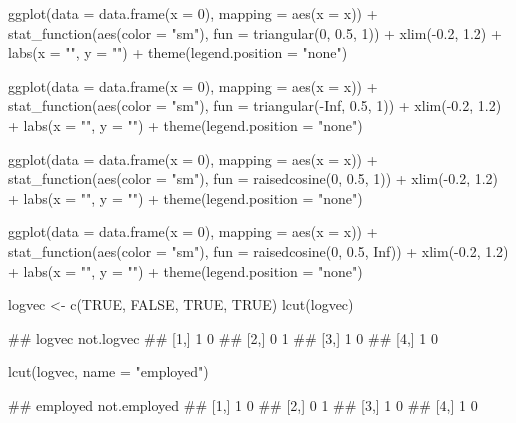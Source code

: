 \documentclass{article}\usepackage[]{graphicx}\usepackage[]{color}
\begin{document}
\begin{Schunk}
\begin{Sinput}
ggplot(data = data.frame(x = 0), mapping = aes(x = x)) + stat_function(aes(color = "sm"), 
    fun = triangular(0, 0.5, 1)) + xlim(-0.2, 1.2) + labs(x = "", y = "") + 
    theme(legend.position = "none")
\end{Sinput}
\end{Schunk}

\begin{Schunk}
\begin{Sinput}
ggplot(data = data.frame(x = 0), mapping = aes(x = x)) + stat_function(aes(color = "sm"), 
    fun = triangular(-Inf, 0.5, 1)) + xlim(-0.2, 1.2) + labs(x = "", y = "") + 
    theme(legend.position = "none")
\end{Sinput}
\end{Schunk}

\begin{Schunk}
\begin{Sinput}
ggplot(data = data.frame(x = 0), mapping = aes(x = x)) + stat_function(aes(color = "sm"), 
    fun = raisedcosine(0, 0.5, 1)) + xlim(-0.2, 1.2) + labs(x = "", y = "") + 
    theme(legend.position = "none")
\end{Sinput}
\end{Schunk}

\begin{Schunk}
\begin{Sinput}
ggplot(data = data.frame(x = 0), mapping = aes(x = x)) + stat_function(aes(color = "sm"), 
    fun = raisedcosine(0, 0.5, Inf)) + xlim(-0.2, 1.2) + labs(x = "", y = "") + 
    theme(legend.position = "none")
\end{Sinput}
\end{Schunk}

\begin{Schunk}
% --begin: "lcut.logical"
\begin{Sinput}
logvec <- c(TRUE, FALSE, TRUE, TRUE)
lcut(logvec)
\end{Sinput}
\begin{Soutput}
##      logvec not.logvec
## [1,]      1          0
## [2,]      0          1
## [3,]      1          0
## [4,]      1          0
\end{Soutput}
\begin{Sinput}
lcut(logvec, name = "employed")
\end{Sinput}
\begin{Soutput}
##      employed not.employed
## [1,]        1            0
## [2,]        0            1
## [3,]        1            0
## [4,]        1            0
\end{Soutput}
%
% --end: "lcut.logical"
\end{Schunk}
\end{document}
